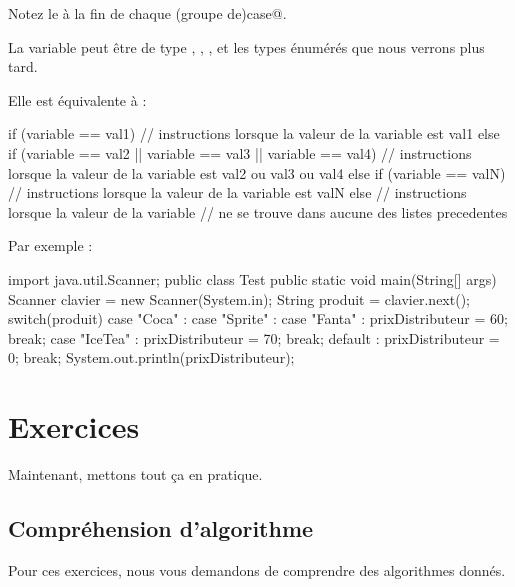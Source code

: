 \documentclass[11pt,a4paper]{article}
\begin{document}
        Notez le \verb@break@ \`a la fin de chaque (groupe de)\verb@ case@.
      
            \par
        
        La variable peut \^etre de type \verb@byte@, \verb@short@, 
        \verb@char@, \verb@int@\verb@String@ et 
        les types \'enum\'er\'es que nous verrons plus tard.
      
            \par
        
        Elle est \'equivalente \`a : 
      
            \par
        \begin{Java}
if (variable == val1){
      // instructions lorsque la valeur de la variable est val1
} else if (variable ==  val2 || variable ==  val3 || variable == val4){
      // instructions lorsque la valeur de la variable est val2 ou val3 ou val4
} else if (variable == valN){
      // instructions lorsque la valeur de la variable est valN
} else {
      // instructions lorsque la valeur de la variable
      // ne se trouve dans aucune des listes precedentes
}      \end{Java}Par exemple : 
            \par
        \begin{Java}
import java.util.Scanner;
public class Test{
  public static void main(String[] args){
      Scanner clavier = new Scanner(System.in);
      String produit = clavier.next();
      switch(produit) {
        case "Coca" :
        case "Sprite" :
        case "Fanta" :
        prixDistributeur = 60;
        break;
      case "IceTea" :
        prixDistributeur = 70;
        break;
      default :
        prixDistributeur = 0;
        break;
      }
      System.out.println(prixDistributeur);
    }
}
      \end{Java}\section{Exercices}
				Maintenant, mettons tout \c ca en pratique.
      
            \par
        \subsection{Compr\'ehension d'algorithme}
          Pour ces exercices, nous vous demandons de comprendre des algorithmes donn\'es. 
          
\end{document}
